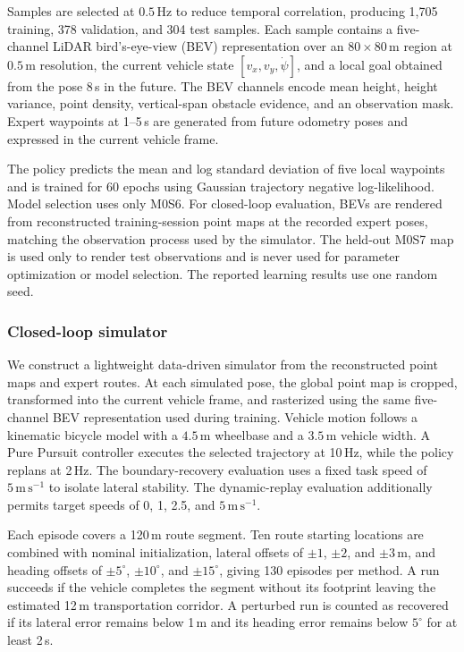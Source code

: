 Samples are selected at $0.5\,\mathrm{Hz}$ to reduce temporal correlation, producing 1,705 training, 378 validation, and 304 test samples. Each sample contains a five-channel LiDAR bird's-eye-view (BEV) representation over an $80\times80\,\mathrm{m}$ region at $0.5\,\mathrm{m}$ resolution, the current vehicle state $[v_x,v_y,\dot{\psi}]$, and a local goal obtained from the pose 8\,s in the future. The BEV channels encode mean height, height variance, point density, vertical-span obstacle evidence, and an observation mask. Expert waypoints at 1--5\,s are generated from future odometry poses and expressed in the current vehicle frame.

The policy predicts the mean and log standard deviation of five local waypoints and is trained for 60 epochs using Gaussian trajectory negative log-likelihood. Model selection uses only M0S6. For closed-loop evaluation, BEVs are rendered from reconstructed training-session point maps at the recorded expert poses, matching the observation process used by the simulator. The held-out M0S7 map is used only to render test observations and is never used for parameter optimization or model selection. The reported learning results use one random seed.

\subsubsection{Closed-loop simulator}

We construct a lightweight data-driven simulator from the reconstructed point maps and expert routes. At each simulated pose, the global point map is cropped, transformed into the current vehicle frame, and rasterized using the same five-channel BEV representation used during training. Vehicle motion follows a kinematic bicycle model with a $4.5\,\mathrm{m}$ wheelbase and a $3.5\,\mathrm{m}$ vehicle width. A Pure Pursuit controller executes the selected trajectory at 10\,Hz, while the policy replans at 2\,Hz. The boundary-recovery evaluation uses a fixed task speed of $5\,\mathrm{m\,s^{-1}}$ to isolate lateral stability. The dynamic-replay evaluation additionally permits target speeds of 0, 1, 2.5, and $5\,\mathrm{m\,s^{-1}}$.

Each episode covers a 120\,m route segment. Ten route starting locations are combined with nominal initialization, lateral offsets of $\pm1$, $\pm2$, and $\pm3\,\mathrm{m}$, and heading offsets of $\pm5^\circ$, $\pm10^\circ$, and $\pm15^\circ$, giving 130 episodes per method. A run succeeds if the vehicle completes the segment without its footprint leaving the estimated 12\,m transportation corridor. A perturbed run is counted as recovered if its lateral error remains below 1\,m and its heading error remains below $5^\circ$ for at least 2\,s.

